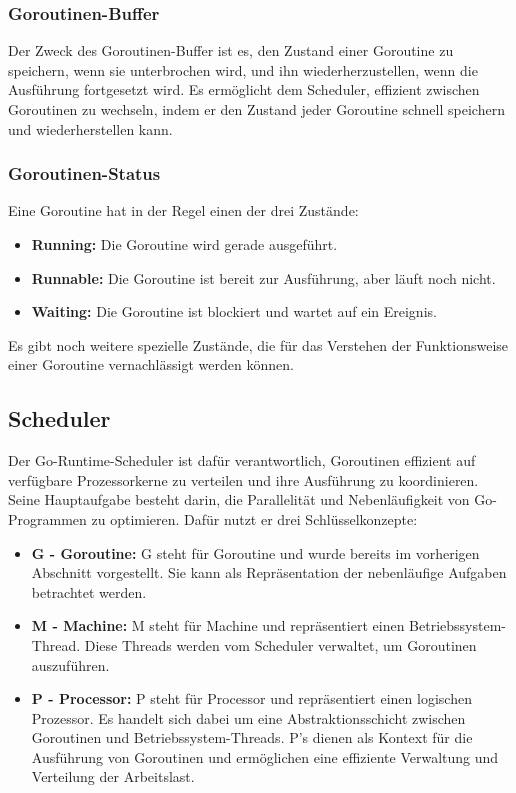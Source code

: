 \documentclass[fontsize=12pt,paper=a4,twoside=semi,parskip=half-,headsepline,headinclude]{scrreprt}
\begin{document}
\subsubsection{Goroutinen-Buffer}
Der Zweck des Goroutinen-Buffer ist es, den Zustand einer Goroutine zu speichern, wenn sie unterbrochen wird, und ihn wiederherzustellen, wenn die Ausführung fortgesetzt wird. Es ermöglicht dem Scheduler, effizient zwischen Goroutinen zu wechseln, indem er den Zustand jeder Goroutine schnell speichern und wiederherstellen kann.
 
\subsubsection{Goroutinen-Status}

Eine Goroutine hat in der Regel einen der drei Zustände:

\begin{itemize}
	\item \textbf{Running:} Die Goroutine wird gerade ausgeführt.
	\item \textbf{Runnable:} Die Goroutine ist bereit zur Ausführung, aber läuft noch nicht.
	\item \textbf{Waiting:} Die Goroutine ist blockiert und wartet auf ein Ereignis.
\end{itemize}	

Es gibt noch weitere spezielle Zustände, die für das Verstehen der Funktionsweise einer Goroutine vernachlässigt werden können.
	
\subsection{Scheduler}
\label{subsec:scheduler}

Der Go-Runtime-Scheduler \cite{goScheduler2024} ist dafür verantwortlich, Goroutinen effizient auf ver\-füg\-bare Prozessorkerne zu verteilen und ihre Ausführung zu koordinieren. Seine Hauptaufgabe besteht darin, die Parallelität und Nebenläufigkeit von Go-Programmen zu optimieren. Dafür nutzt er drei Schlüsselkonzepte:

\begin{itemize}
	\item \textbf{G - Goroutine:} G steht für Goroutine und wurde bereits im vorherigen Abschnitt vorgestellt. Sie kann als Repräsentation der nebenläufige Aufgaben betrachtet werden.
	\item \textbf{M - Machine:} M steht für Machine und repräsentiert einen Betriebssystem-Thread. Diese Threads werden vom Scheduler verwaltet, um Goroutinen auszuführen.
	\item \textbf{P - Processor:} P steht für Processor und repräsentiert einen logischen Prozessor. Es handelt sich dabei um eine Abstraktionsschicht zwischen Goroutinen und Betriebssystem-Threads. P's dienen als Kontext für die Ausführung von Goroutinen und ermöglichen eine effiziente Verwaltung und Verteilung der Arbeitslast.
\end{itemize}	
\end{document}
